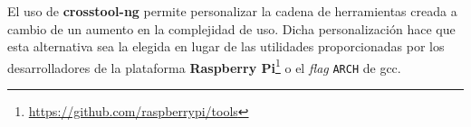 El uso de \textbf{crosstool-ng} permite personalizar la cadena de herramientas creada a cambio de un aumento en la complejidad de uso. Dicha personalización hace que esta alternativa sea la elegida en lugar de las utilidades proporcionadas por los desarrolladores de la plataforma \textbf{Raspberry Pi}\footnote{\href{https://github.com/raspberrypi/tools}{https://github.com/raspberrypi/tools}} o el \textit{flag} \texttt{ARCH} de gcc.